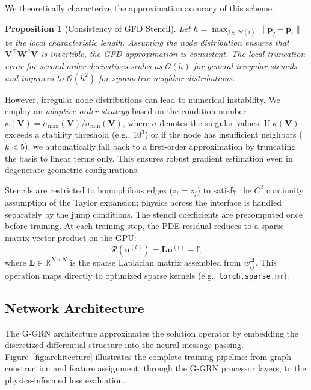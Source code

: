 \documentclass[11pt]{article}
\theoremstyle{definition}
\theoremstyle{remark}
\theoremstyle{plain}
\newtheorem{proposition}{Proposition} %
\begin{document}
We theoretically characterize the approximation accuracy of this scheme.
\begin{proposition}[Consistency of GFD Stencil]
\label{prop:consistency}
Let $h = \max_{j \in \mathcal{N}(i)} \|\mathbf{p}_j - \mathbf{p}_i\|$ be the local characteristic length. Assuming the node distribution ensures that $\mathbf{V}^\top \mathbf{W}^2 \mathbf{V}$ is invertible, the GFD approximation is consistent. The local truncation error for second-order derivatives scales as $\mathcal{O}(h)$ for general irregular stencils and improves to $\mathcal{O}(h^2)$ for symmetric neighbor distributions.
\end{proposition}

However, irregular node distributions can lead to numerical instability. We employ an \textit{adaptive order strategy} based on the condition number $\kappa(\mathbf{V}) = \sigma_{\max}(\mathbf{V}) / \sigma_{\min}(\mathbf{V})$, where $\sigma$ denotes the singular values. If $\kappa(\mathbf{V})$ exceeds a stability threshold (e.g., $10^3$) or if the node has insufficient neighbors ($k < 5$), we automatically fall back to a first-order approximation by truncating the basis to linear terms only. This ensures robust gradient estimation even in degenerate geometric configurations.

Stencils are restricted to homophilous edges ($z_i = z_j$) to satisfy the $C^2$ continuity assumption of the Taylor expansion; physics across the interface is handled separately by the jump conditions. The stencil coefficients are precomputed once before training. At each training step, the PDE residual reduces to a sparse matrix-vector product on the GPU:
\begin{equation}
    \mathcal{R}(\mathbf{u}^{(t)}) = \mathbf{L} \mathbf{u}^{(t)} - \mathbf{f},
\end{equation}
where $\mathbf{L} \in \mathbb{R}^{N \times N}$ is the sparse Laplacian matrix assembled from $w_{ij}^{\Delta}$. This operation maps directly to optimized sparse kernels (e.g., \texttt{torch.sparse.mm}).

\subsection{Network Architecture}
\label{sec:architecture}

The G-GRN architecture approximates the solution operator by embedding the discretized differential structure into the neural message passing. Figure~\ref{fig:architecture} illustrates the complete training pipeline: from graph construction and feature assignment, through the G-GRN processor layers, to the physics-informed loss evaluation.
\end{document}
